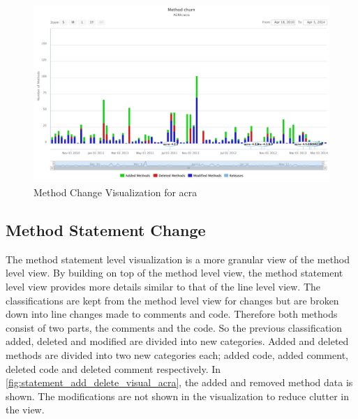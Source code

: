 \begin{landscape}
\thispagestyle{empty}
 \begin{figure}
  \centering
    \includegraphics[width=1.5\textwidth]{images/method_visual_acra}
    \caption{Method Change Visualization for acra}
    \label{fig:method_visual_acra}
 \end{figure}
\end{landscape}
\thispagestyle{plain}


\subsection{Method Statement Change}

The method statement level visualization is a more granular view of the method level view. By building on top of the method level view, the method statement level view provides more details similar to that of the line level view. The classifications are kept from the method level view for changes but are broken down into line changes made to comments and code. Therefore both methods consist of two parts, the comments and the code. So the previous classification added, deleted and modified are divided into new categories. Added and deleted methods are divided into two new categories each; added code, added comment, deleted code and deleted comment respectively. In \autoref{fig:statement_add_delete_visual_acra}, the added and removed method data is shown. The modifications are not shown in the visualization to reduce clutter in the view.

